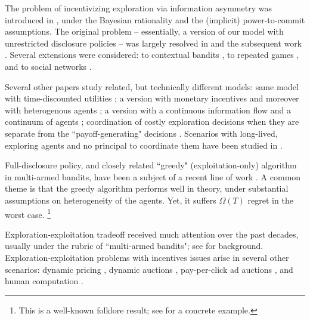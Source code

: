 The problem of incentivizing exploration via information asymmetry was introduced in \cite{Kremer-JPE14}, under the Bayesian rationality and the (implicit) power-to-commit assumptions. The original problem -- essentially, a version of our model with unrestricted disclosure policies -- was largely resolved in \cite{Kremer-JPE14} and the subsequent work \cite{ICexploration-ec15,ICexplorationGames-ec16}. Several extensions were considered: to contextual bandits \cite{ICexploration-ec15}, to repeated games
\cite{ICexplorationGames-ec16}, and to social networks \cite{Bahar-ec16}.

Several other papers study related, but technically different models: same model with time-discounted utilities \cite{Bimpikis-exploration-ms17}; a version with monetary incentives \cite{Frazier-ec14} and moreover with heterogenous agents \cite{Kempe-colt18}; a version with a continuous information flow and a continuum of agents \cite{Che-13}; coordination of costly exploration decisions when they are separate from the ``payoff-generating" decisions \cite{Bobby-Glen-ec16,Annie-ec18-traps,Liang-ec18}. Scenarios with long-lived, exploring agents and no principal to coordinate them have been studied in \cite{Bolton-econometrica99,Keller-econometrica05}.

Full-disclosure policy, and closely related ``greedy" (exploitation-only) algorithm in multi-armed bandits, have been a subject of a recent line of work \cite{Sven-aistats18,kannan2018smoothed,bastani2017exploiting,externalities-colt18}.
A common theme is that the greedy algorithm performs well in theory, under  substantial assumptions on heterogeneity of the agents. Yet, it suffers $\Omega(T)$ regret in the worst case.%
\footnote{This is a well-known folklore result; \eg see \cite{CompetingBandits-itcs18} for a concrete example.}

Exploration-exploitation tradeoff received much attention over the past decades, usually under the rubric of ``multi-armed bandits"; see  \cite{Bubeck-survey12,Gittins-book11} for background.
Exploration-exploitation problems with incentives issues arise in several other scenarios: dynamic pricing
    \cite{KleinbergL03,BZ09,BwK-focs13},
dynamic auctions
    \cite{AtheySegal-econometrica13,DynPivot-econometrica10,Kakade-pivot-or13},
pay-per-click ad auctions
    \cite{MechMAB-ec09,DevanurK09,Transform-ec10-jacm},
and human computation
    \cite{RepeatedPA-ec14,Ghosh-itcs13,Krause-www13}.

